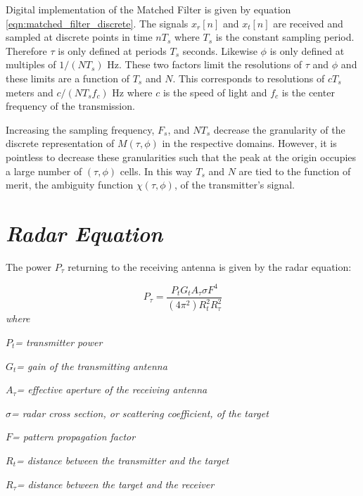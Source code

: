 \documentclass[a4paper]{report}
\newcommand\textstyleEmphasis[1]{\textit{#1}}
\numberwithin{equation}{chapter}
\begin{document}
\bigskip

Digital implementation of the Matched Filter is given by equation \ref{eqn:matched_filter_discrete}. The signals $x_r[n]$ and $x_t[n]$ are received and sampled at discrete points in time $nT_s$ where $T_s$ is the constant sampling period. Therefore $\tau$ is only defined at periods $T_s$ seconds. Likewise $\phi$ is only defined at multiples of $1/(NT_s)$ Hz. These two factors limit the resolutions of $\tau$ and $\phi$ and these limits are a function of $T_s$ and $N$. This corresponds to resolutions of $cT_s$ meters and $c/(NT_sf_c)$ Hz where $c$ is the speed of light and $f_c$ is the center frequency of the transmission.

\bigskip

Increasing the sampling frequency, $F_s$, and $NT_s$ decrease the granularity of the discrete representation of $M(\tau, \phi)$ in the respective domains. However, it is pointless to decrease these granularities such that the peak at the origin occupies a large number of $(\tau, \phi)$ cells. In this way $T_s$ and $N$ are tied to the function of merit, the ambiguity function $\chi(\tau, \phi)$, of the transmitter's signal.

\section[Radar Equation]{\textstyleEmphasis{\textup{Radar Equation}}}
The power  $P_{\tau }$ returning to the receiving antenna is given by
the radar equation:

\begin{equation}
P_{\tau }=\frac{P_{t}G_{t}A_{\tau }\sigma F^{4}}{\left(4\pi^{2}\right)R_{t}^{2}R_{\tau }^{2}}
\end{equation}
\textstyleEmphasis{\textup{where}}

 $P_{t}$\textstyleEmphasis{\textup{= transmitter power}}

 $G_{t}$\textstyleEmphasis{\textup{= gain of the transmitting antenna}}

 $A_{\tau }$\textstyleEmphasis{\textup{= effective aperture of the
receiving antenna}}

 $\sigma $\textstyleEmphasis{\textup{= radar cross section, or
scattering coefficient, of the target}}

 $F$\textstyleEmphasis{\textup{= pattern propagation factor}}

 $R_{t}$\textstyleEmphasis{\textup{= distance between the transmitter
and the target}}

 $R_{\tau }$\textstyleEmphasis{\textup{= distance between the
target and the receiver}}
\end{document}
